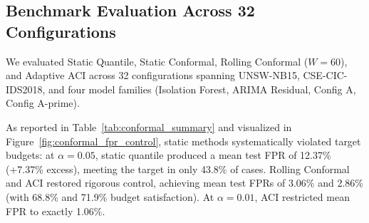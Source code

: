 \documentclass[10pt,twocolumn]{article}
\begin{document}
\subsection{Benchmark Evaluation Across 32 Configurations}
We evaluated Static Quantile, Static Conformal, Rolling Conformal ($W=60$), and Adaptive ACI across 32 configurations spanning UNSW-NB15, CSE-CIC-IDS2018, and four model families (Isolation Forest, ARIMA Residual, Config A, Config A-prime).

\begin{table}[t]
\centering
\caption{Conformal Threshold Benchmark Summary Across 32 Evaluated Configurations}\label{tab:conformal_summary}
\setlength{\tabcolsep}{5pt}
\end{table}

As reported in Table~\ref{tab:conformal_summary} and visualized in Figure~\ref{fig:conformal_fpr_control}, static methods systematically violated target budgets: at $\alpha = 0.05$, static quantile produced a mean test FPR of 12.37\% (+7.37\% excess), meeting the target in only 43.8\% of cases. Rolling Conformal and ACI restored rigorous control, achieving mean test FPRs of 3.06\% and 2.86\% (with 68.8\% and 71.9\% budget satisfaction). At $\alpha = 0.01$, ACI restricted mean FPR to exactly 1.06\%.
\end{document}
